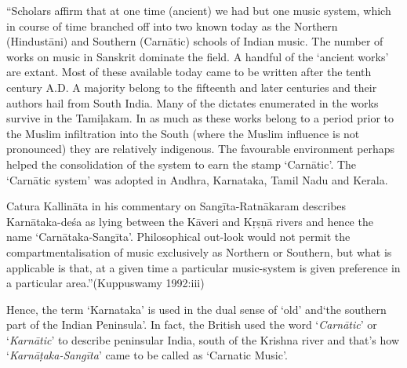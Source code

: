 \begin{myquote}
“Scholars affirm that at one time (ancient) we had but one music system, which in course of time branched off into two known today as the Northern (Hindustāni) and Southern (Carnātic) schools of Indian music. The number of works on music in Sanskrit dominate the field. A handful of the ‘ancient works’ are extant. Most of these available today came to be written after the tenth century A.D. A majority belong to the fifteenth and later centuries and their authors hail from South India. Many of the dictates enumerated in the works survive in the Tamiḷakam. In as much as these works belong to a period prior to the Muslim infiltration into the South (where the Muslim influence is not pronounced) they are relatively indigenous. The favourable environment perhaps helped the consolidation of the system to earn the stamp ‘Carnātic’. The ‘Carnātic system’ was adopted in Andhra, Karnataka, Tamil Nadu and Kerala.
\end{myquote}

\begin{myquote}
Catura Kallināta in his commentary on Sangīta-Ratnākaram describes Karnātaka-deśa as lying between the Kāveri and Kṛṣṇā rivers and hence the name ‘Carnātaka-Sangīta’. Philosophical out-look would not permit the compartmentalisation of music exclusively as Northern or Southern, but what is applicable is that, at a given time a particular music-system is given preference in a particular area.”\hfill (Kuppuswamy 1992:iii)
\end{myquote}

Hence, the term ‘Karnataka’ is used in the dual sense of ‘old’ and\break ‘the southern part of the Indian Peninsula’. In fact, the British used the word ‘\textit{Carnātic}’ or ‘\textit{Karnātic}’ to describe peninsular India, south of the Krishna river and that’s how ‘\textit{Karnāṭaka-Sangīta}’ came to be called as ‘Carnatic Music’. 


